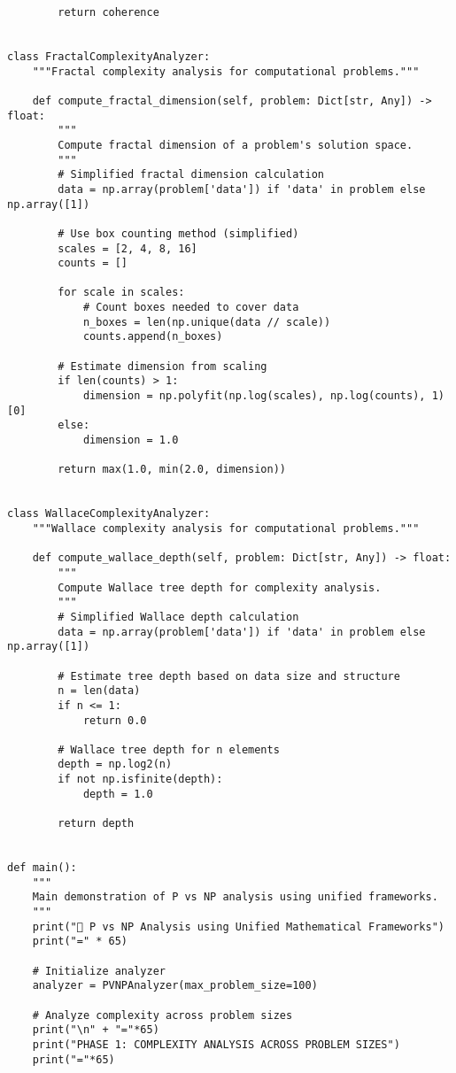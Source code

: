 \documentclass[12pt]{article}
\begin{document}
\begin{lstlisting}
        return coherence


class FractalComplexityAnalyzer:
    """Fractal complexity analysis for computational problems."""

    def compute_fractal_dimension(self, problem: Dict[str, Any]) -> float:
        """
        Compute fractal dimension of a problem's solution space.
        """
        # Simplified fractal dimension calculation
        data = np.array(problem['data']) if 'data' in problem else np.array([1])

        # Use box counting method (simplified)
        scales = [2, 4, 8, 16]
        counts = []

        for scale in scales:
            # Count boxes needed to cover data
            n_boxes = len(np.unique(data // scale))
            counts.append(n_boxes)

        # Estimate dimension from scaling
        if len(counts) > 1:
            dimension = np.polyfit(np.log(scales), np.log(counts), 1)[0]
        else:
            dimension = 1.0

        return max(1.0, min(2.0, dimension))


class WallaceComplexityAnalyzer:
    """Wallace complexity analysis for computational problems."""

    def compute_wallace_depth(self, problem: Dict[str, Any]) -> float:
        """
        Compute Wallace tree depth for complexity analysis.
        """
        # Simplified Wallace depth calculation
        data = np.array(problem['data']) if 'data' in problem else np.array([1])

        # Estimate tree depth based on data size and structure
        n = len(data)
        if n <= 1:
            return 0.0

        # Wallace tree depth for n elements
        depth = np.log2(n)
        if not np.isfinite(depth):
            depth = 1.0

        return depth


def main():
    """
    Main demonstration of P vs NP analysis using unified frameworks.
    """
    print("🧮 P vs NP Analysis using Unified Mathematical Frameworks")
    print("=" * 65)

    # Initialize analyzer
    analyzer = PVNPAnalyzer(max_problem_size=100)

    # Analyze complexity across problem sizes
    print("\n" + "="*65)
    print("PHASE 1: COMPLEXITY ANALYSIS ACROSS PROBLEM SIZES")
    print("="*65)


\end{lstlisting}
\end{document}
